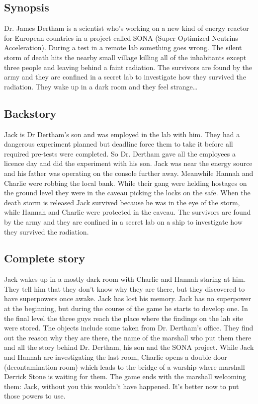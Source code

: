 \subsection{Synopsis}
Dr. James Dertham is a scientist who's working on a new kind of energy reactor for European countries in a project called SONA (Super Optimized Neutrins Acceleration). During a test in a remote lab something goes wrong. The silent storm of death hits the nearby small village killing all of the inhabitants except three people and leaving behind a faint radiation.  The survivors are found by the army and they are confined in a secret lab to investigate how they survived the radiation.
They wake up in a dark room and they feel strange… 

\subsection{Backstory}
Jack is Dr Dertham’s son and was employed in the lab with him. They had a dangerous experiment planned but deadline force them to take it before all required pre-tests were completed. So Dr. Dertham gave all the employees a licence day and did the experiment with his son. Jack was near the energy source and his father was operating on the console further away. Meanwhile Hannah and Charlie were robbing the local bank. While their gang were helding hostages on the ground level they were in the caveau picking the locks on the safe.
When the death storm is released Jack survived because he was in the eye of the storm, while Hannah and Charlie were protected in the caveau. 
The survivors are found by the army and they are confined in a secret lab on a ship to investigate how they survived the radiation.

\subsection{Complete story}
Jack wakes up in a mostly dark room with Charlie and Hannah staring at him. They tell him that they don't know why they are there, but they discovered to have superpowers once awake. Jack has lost his memory. Jack has no superpower at the beginning, but during the course of the game he starts to develop one. In the final level the three guys reach the place where the findings on the lab site were stored. The objects include some taken from Dr. Dertham’s office. They find out the reason why they are there, the name of the marshall who put them there and all the story behind Dr. Dertham, his son and the SONA project. While Jack and Hannah are investigating the last room, Charlie opens a double door (decontamination room) which leads to the bridge of a warship where marshall Derrick Stone is waiting for them. The game ends with the marshall welcoming them: Jack, without you this wouldn’t have happened. It’s better now to put those powers to use.


